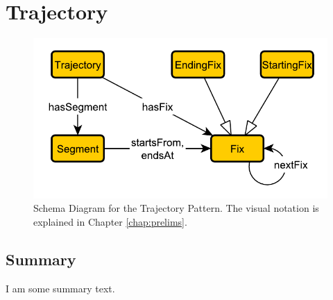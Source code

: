 \section{Trajectory}
\label{sec:Trajectory}
\begin{figure}[h!]
\begin{center}
\includegraphics[width=.8\textwidth]{figures/trajectory}
\end{center}
\caption{Schema Diagram for the Trajectory Pattern. The visual notation is explained in Chapter \ref{chap:prelims}.}
\label{fig:Spatiotemporal}
\label{fig:Trajectory}
\end{figure}
\subsection{Summary}
\label{sum:Trajectory}
I am some summary text.

